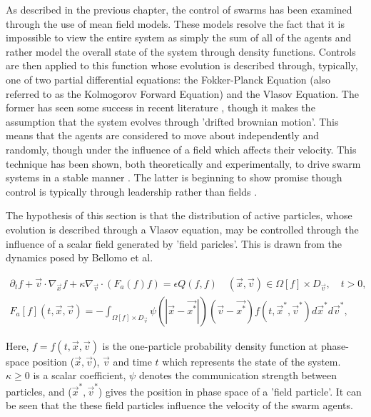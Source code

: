 \documentclass[.../main.tex]{subfiles}
\begin{document}
    As described in the previous chapter, the control of swarms has been examined through the use of
    mean field models. These models resolve the fact that it is impossible to view the entire system
    as simply the sum of all of the agents and rather model the overall state of the system through
    density functions. Controls are then applied to this function whose evolution is described
    through, typically, one of two partial differential equations: the Fokker-Planck Equation (also
    referred to as the Kolmogorov Forward Equation) and the Vlasov Equation. The former has seen
    some success in recent literature \cite{Elamvazhuthi2019, Li2017,
    Roy2017}, though it makes the assumption that the system evolves through 'drifted
    brownian motion'. This means that the agents are considered to move about independently and
    randomly, though under the influence of a field which affects their velocity. This technique
	has been shown, both theoretically and experimentally, to drive swarm systems in a stable
	manner \cite{Fleig}. The latter is beginning to show promise 
	though control is typically through leadership rather than fields \cite{Burger2019}. 

	The hypothesis of this section is that the distribution of active particles, whose evolution is
	described through a Vlasov equation, may be controlled through the influence of a scalar field
	generated by 'field paricles'. This is drawn from the dynamics posed by Bellomo et al. 
	\cite{Bellomo2017}

	\begin{equation}
	\label{eqn::Vlasov}
    \begin{split}    
        \partial_t f + \Vec{v} \cdot \nabla_{\Vec{x}} f + \kappa \nabla_{\Vec{v}} \cdot (F_a (f) f)
        = \epsilon Q(f, f) \quad  (\Vec{x}, \Vec{v}) \in \Omega[f] \times D_{\Vec{v}}, \quad t>0, \\
        F_a[f](t, \Vec{x}, \Vec{v}) = - \int_{\Omega [f] \times D_{\Vec{v}}} \psi (|\Vec{x} - \Vec
        {x^*}|)(\Vec{v} - \Vec{x^*}) f(t, \Vec{x}^*, \Vec{v}^*) d\Vec{x}^* d\Vec{v}^*, 
    \end{split}
    \end{equation}


    Here, $f = f(t, \Vec{x}, \Vec{v})$ is the one-particle probability density function at
    phase-space position ($\Vec{x}, \Vec{v}$), $\Vec{v}$ and time $t$ which represents the state of
    the system. $\kappa \geq 0$ is a scalar
    coefficient, $\psi$ denotes the communication strength between particles, and ($\Vec{x}^*, \Vec
    {v}^*$) gives the position in phase space of a 'field particle'. It can be seen that the these
    field particles influence the velocity of the swarm agents.
\end{document}
